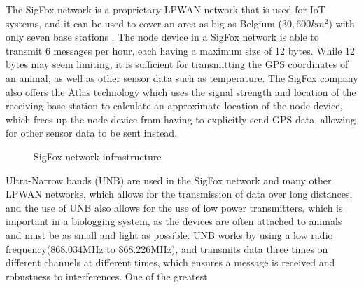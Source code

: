 \documentclass[sigplan,screen,nonacm]{acmart}
\begin{document}
The SigFox network is a proprietary LPWAN 
network that is used for IoT systems, and it can be used to cover an area as 
big as Belgium ($30,600 km^2$) with only seven base stations \cite{wild2023multi}. 
The node device in a SigFox network is able to transmit 6 messages per hour, 
each having a maximum size of 12 bytes. While 12 bytes may seem limiting, it is 
sufficient for transmitting the GPS coordinates of an animal, as well as other 
sensor data such as temperature\cite{wild2023multi}. The SigFox company also offers 
the Atlas technology which uses the signal strength and location of the receiving 
base station to calculate an approximate location of the node device, which frees up 
the node device from having to explicitly send GPS data, allowing for other sensor data 
to be sent instead\cite{wild2023multi}. 
\begin{figure}[htbp]
  \centering
  \caption{SigFox network infrastructure\cite{wild2023multi}}
  \label{fig:SigFox_infrastructure}
\end{figure}
Ultra-Narrow bands (UNB) are used in the SigFox 
network and many other LPWAN networks, which allows for the transmission of data
over long distances, and the use of UNB also allows for the use of low power
transmitters, which is important in a biologging system, as the devices are
often attached to animals and must be as small and light as possible.
UNB works by using a low radio frequency(868.034MHz to 868.226MHz), and transmits data three 
times on different channels at different times, which ensures a message is received 
and robustness to interferences\cite{LavricSigfoxCommunication}. One of the greatest 
\end{document}
